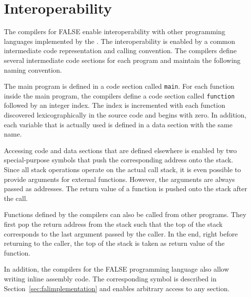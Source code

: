 \falprint
\falcheck
\faldump
\falrun
\falcpp
\falcode
\falamda
\falamdb
\falamdc
\falarma
\falarmb
\falarmc
\falarmcfpe
\falavr
\falavrtt
\falmabk
\falmibl
\falmipsa
\falmipsb
\falmmix
\falorok
\falppca
\falppcb
\falrisc
\falwasm

\section{Interoperability}\label{sec:falinteroperability}

The compilers for FALSE enable interoperability with other programming languages implemented by the \ecs{}.
The interoperability is enabled by a common intermediate code representation and calling convention. \seecode
The compilers define several intermediate code sections for each program and maintain the following naming convention.

The main program is defined in a code section called \texttt{main}.
For each function inside the main program, the compilers define a code section called \texttt{function} followed by an integer index.
The index is incremented with each function discovered lexicographically in the source code and begins with zero.
In addition, each variable that is actually used is defined in a data section with the same name.

Accessing code and data sections that are defined elsewhere is enabled by two special-purpose symbols that push the corresponding address onto the stack.
Since all stack operations operate on the actual call stack, it is even possible to provide arguments for external functions.
However, the arguments are always passed as addresses.
The return value of a function is pushed onto the stack after the call.

Functions defined by the compilers can also be called from other programs.
They first pop the return address from the stack such that the top of the stack corresponds to the last argument passed by the caller.
In the end, right before returning to the caller, the top of the stack is taken as return value of the function.

In addition, the compilers for the FALSE programming language also allow writing inline assembly code.
The corresponding symbol is described in Section~\ref{sec:falimplementation} and enables arbitrary access to any section.
\seeassembly

\concludechapter
